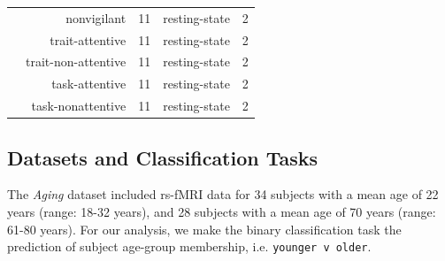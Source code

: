 \documentclass[12pt]{spieman}  %
\newcommand{\code}[1]{\small\texttt{#1}\normalsize}
\begin{document}
\begin{spacing}{2}
\begin{table}[h!]
\begin{tabular}{ l r c c c }
        &  nonvigilant         & 11     & resting-state        & 2 \\
        &  trait-attentive     & 11    & resting-state        & 2 \\
        &  trait-non-attentive & 11    & resting-state        & 2 \\
        &  task-attentive     & 11     & resting-state        & 2 \\
        &  task-nonattentive  & 11     & resting-state        & 2 \\
\hline
\end{tabular}
\end{table}



\subsection{Datasets and Classification Tasks}


The \textit{Aging} dataset\cite{wahlheimIntrinsicFunctionalConnectivity2021}
included rs-fMRI data for 34 subjects with a mean age of 22 years (range: 18-32
years), and 28 subjects with a mean age of 70 years (range: 61-80 years). For
our analysis, we make the binary classification task the prediction of subject
age-group membership, i.e. \code{younger v older}.



\end{spacing}
\end{document}
